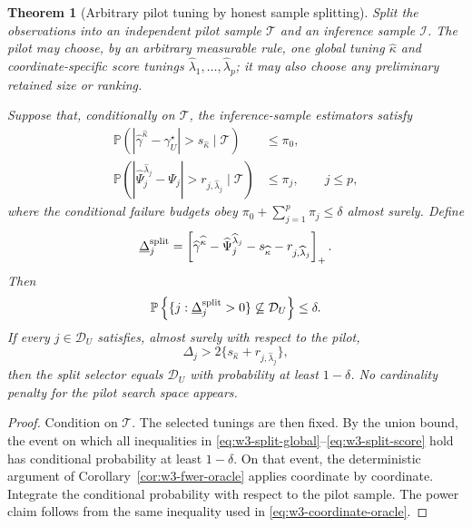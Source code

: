 \documentclass[11pt]{article}
\newtheorem{theorem}{Theorem}[section]
\theoremstyle{remark}
\newcommand{\Pp}{\mathbb P}
\newcommand{\DU}{\mathcal D_U}
\begin{document}
\begin{theorem}[Arbitrary pilot tuning by honest sample splitting]
\label{thm:w3-split}
Split the observations into an independent pilot sample $\mathcal T$ and an
inference sample $\mathcal I$.  The pilot may choose, by an arbitrary
measurable rule, one global tuning $\widehat\kappa$ and coordinate-specific
score tunings $\widehat\lambda_1,\ldots,\widehat\lambda_p$; it may also choose
any preliminary retained size or ranking.

Suppose that, conditionally on $\mathcal T$, the inference-sample estimators
satisfy
\begin{align}
 \Pp\left(
 |\widehat\gamma^{\widehat\kappa}-\gamma_U^\star|>
 s_{\widehat\kappa}
 \mid\mathcal T\right)&\le\pi_0,
 \label{eq:w3-split-global}\\
 \Pp\left(
 |\widehat\Psi_j^{\widehat\lambda_j}-\Psi_j|>
 r_{j,\widehat\lambda_j}
 \mid\mathcal T\right)&\le\pi_j,
 \qquad j\le p,
 \label{eq:w3-split-score}
\end{align}
where the conditional failure budgets obey
$\pi_0+\sum_{j=1}^p\pi_j\le\delta$ almost surely.  Define
\begin{equation}
 \underline\Delta_j^{\rm split}
 =\left[
 \widehat\gamma^{\widehat\kappa}
 -\widehat\Psi_j^{\widehat\lambda_j}
 -s_{\widehat\kappa}-r_{j,\widehat\lambda_j}
 \right]_+.
 \label{eq:w3-split-lower}
\end{equation}
Then
\begin{equation}
 \Pp\left\{
 \{j:\underline\Delta_j^{\rm split}>0\}
 \not\subseteq\DU
 \right\}\le\delta.
 \label{eq:w3-split-fwer}
\end{equation}
If every $j\in\DU$ satisfies, almost surely with respect to the pilot,
\begin{equation}
 \Delta_j>
 2\{s_{\widehat\kappa}+r_{j,\widehat\lambda_j}\},
 \label{eq:w3-split-power}
\end{equation}
then the split selector equals $\DU$ with probability at least $1-\delta$.
No cardinality penalty for the pilot search space appears.
\end{theorem}

\begin{proof}
Condition on $\mathcal T$.  The selected tunings are then fixed.  By the union
bound, the event on which all inequalities in
\eqref{eq:w3-split-global}--\eqref{eq:w3-split-score} hold has conditional
probability at least $1-\delta$.  On that event, the deterministic argument of
Corollary~\ref{cor:w3-fwer-oracle} applies coordinate by coordinate.  Integrate
the conditional probability with respect to the pilot sample.  The power
claim follows from the same inequality used in
\eqref{eq:w3-coordinate-oracle}.
\end{proof}
\end{document}
